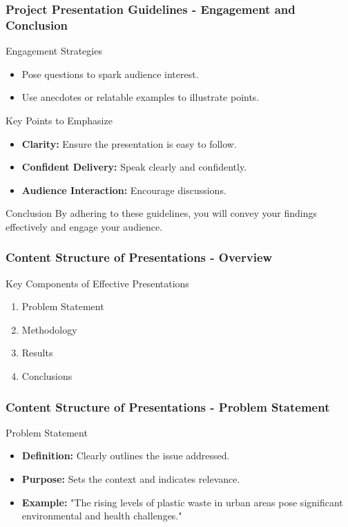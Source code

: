 \documentclass[aspectratio=169]{beamer}
\begin{document}
\begin{frame}[fragile]
    \frametitle{Project Presentation Guidelines - Engagement and Conclusion}
    \begin{block}{Engagement Strategies}
        \begin{itemize}
            \item Pose questions to spark audience interest.
            \item Use anecdotes or relatable examples to illustrate points.
        \end{itemize}
    \end{block}

    \begin{block}{Key Points to Emphasize}
        \begin{itemize}
            \item \textbf{Clarity:} Ensure the presentation is easy to follow.
            \item \textbf{Confident Delivery:} Speak clearly and confidently.
            \item \textbf{Audience Interaction:} Encourage discussions.
        \end{itemize}
    \end{block}

    \begin{block}{Conclusion}
        By adhering to these guidelines, you will convey your findings effectively and engage your audience. 
    \end{block}
\end{frame}

\begin{frame}[fragile]
    \frametitle{Content Structure of Presentations - Overview}
    \begin{block}{Key Components of Effective Presentations}
        \begin{enumerate}
            \item Problem Statement
            \item Methodology
            \item Results
            \item Conclusions
        \end{enumerate}
    \end{block}
\end{frame}

\begin{frame}[fragile]
    \frametitle{Content Structure of Presentations - Problem Statement}
    \begin{block}{Problem Statement}
        \begin{itemize}
            \item \textbf{Definition:} Clearly outlines the issue addressed.
            \item \textbf{Purpose:} Sets the context and indicates relevance.
            \item \textbf{Example:} 
            "The rising levels of plastic waste in urban areas pose significant environmental and health challenges."
        \end{itemize}
    \end{block}
\end{frame}
\end{document}
